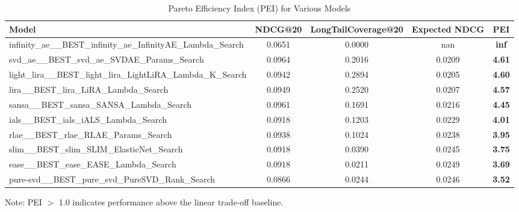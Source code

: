 
\begin{table}[htbp]
\centering
\caption{Pareto Efficiency Index (PEI) for Various Models}
\label{tab:pei_analysis}
\begin{tabular}{lcccc}
\toprule
\textbf{Model} & \textbf{NDCG@20} & \textbf{LongTailCoverage@20} & \textbf{Expected NDCG} & \textbf{PEI} \\
\midrule
infinity_ae__BEST_infinity_ae_InfinityAE_Lambda_Search & 0.0651 & 0.0000 & nan & \textbf{inf} \\
svd_ae__BEST_svd_ae_SVDAE_Params_Search & 0.0964 & 0.2016 & 0.0209 & \textbf{4.61} \\
light_lira__BEST_light_lira_LightLiRA_Lambda_K_Search & 0.0942 & 0.2894 & 0.0205 & \textbf{4.60} \\
lira__BEST_lira_LiRA_Lambda_Search & 0.0949 & 0.2520 & 0.0207 & \textbf{4.57} \\
sansa__BEST_sansa_SANSA_Lambda_Search & 0.0961 & 0.1691 & 0.0216 & \textbf{4.45} \\
ials__BEST_ials_iALS_Lambda_Search & 0.0918 & 0.1203 & 0.0229 & \textbf{4.01} \\
rlae__BEST_rlae_RLAE_Params_Search & 0.0938 & 0.1024 & 0.0238 & \textbf{3.95} \\
slim__BEST_slim_SLIM_ElasticNet_Search & 0.0918 & 0.0390 & 0.0245 & \textbf{3.75} \\
ease__BEST_ease_EASE_Lambda_Search & 0.0918 & 0.0211 & 0.0249 & \textbf{3.69} \\
pure-svd__BEST_pure_svd_PureSVD_Rank_Search & 0.0866 & 0.0244 & 0.0246 & \textbf{3.52} \\

\bottomrule
\end{tabular}
\vspace{5pt}
\footnotesize{Note: PEI $>$ 1.0 indicates performance above the linear trade-off baseline.}
\end{table}
